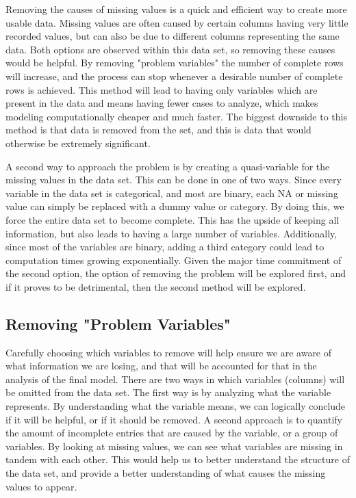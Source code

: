 \documentclass{article} %
\begin{document}
	Removing the causes of missing values is a quick and efficient way to create more usable data. Missing values are often caused by certain columns having very little recorded values, but can also be due to different columns representing the same data. Both options are observed within this data set, so removing these causes would be helpful. By removing "problem variables" the number of complete rows will increase, and the process can stop whenever a desirable number of complete rows is achieved. This method will lead to having only variables which are present in the data and means having fewer cases to analyze, which makes modeling computationally cheaper and much faster. The biggest downside to this method is that data is removed from the set, and this is data that would otherwise be extremely significant.
	
	A second way to approach the problem is by creating a quasi-variable for the missing values in the data set. This can be done in one of two ways. Since every variable in the data set is categorical, and most are binary, each NA or missing value can simply be replaced with a dummy value or category. By doing this, we force the entire data set to become complete. This has the upside of keeping all information, but also leads to having a large number of variables. Additionally, since most of the variables are binary, adding a third category could lead to computation times growing exponentially. Given the major time commitment of the second option, the option of removing the problem will be explored first, and if it proves to be detrimental, then the second method will be explored.
	
	
	
	\subsection{Removing "Problem Variables"}
	
	
	Carefully choosing which variables to remove will help ensure we are aware of what information we are losing, and that will be accounted for that in the analysis of the final model. There are two ways in which variables (columns) will be omitted from the data set. The first way is by analyzing what the variable represents. By understanding what the variable means, we can logically conclude if it will be helpful, or if it should be removed. A second approach is to quantify the amount of incomplete entries that are caused by the variable, or a group of variables. By looking at missing values, we can see what variables are missing in tandem with each other. This would help us to better understand the structure of the data set, and provide a better understanding of what causes the missing values to appear.
	
\end{document}
